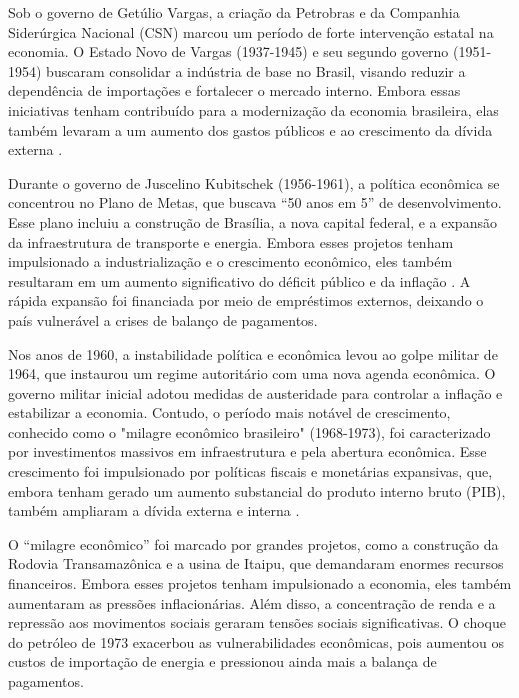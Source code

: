 \documentclass[12pt,oneside,a4paper,chapter=TITLE,english,brazil,sumario=abnt-6027-2012]{abntex2}
\begin{document}
Sob o governo de Getúlio Vargas, a criação da Petrobras e da Companhia Siderúrgica Nacional (CSN) marcou um período de forte intervenção estatal na economia. O Estado Novo de Vargas (1937-1945) e seu segundo governo (1951-1954) buscaram consolidar a indústria de base no Brasil, visando reduzir a dependência de importações e fortalecer o mercado interno. Embora essas iniciativas tenham contribuído para a modernização da economia brasileira, elas também levaram a um aumento dos gastos públicos e ao crescimento da dívida externa \cite{fabiogiambiagi_2016_economia}.

Durante o governo de Juscelino Kubitschek (1956-1961), a política econômica se concentrou no Plano de Metas, que buscava ``50 anos em 5'' de desenvolvimento. Esse plano incluiu a construção de Brasília, a nova capital federal, e a expansão da infraestrutura de transporte e energia. Embora esses projetos tenham impulsionado a industrialização e o crescimento econômico, eles também resultaram em um aumento significativo do déficit público e da inflação \cite{bielschowsky_2022_a}. A rápida expansão foi financiada por meio de empréstimos externos, deixando o país vulnerável a crises de balanço de pagamentos.

Nos anos de 1960, a instabilidade política e econômica levou ao golpe militar de 1964, que instaurou um regime autoritário com uma nova agenda econômica. O governo militar inicial adotou medidas de austeridade para controlar a inflação e estabilizar a economia. Contudo, o período mais notável de crescimento, conhecido como o "milagre econômico brasileiro" (1968-1973), foi caracterizado por investimentos massivos em infraestrutura e pela abertura econômica. Esse crescimento foi impulsionado por políticas fiscais e monetárias expansivas, que, embora tenham gerado um aumento substancial do produto interno bruto (PIB), também ampliaram a dívida externa e interna \cite{amaurypatrickgremaud_2009_economia}.

O ``milagre econômico'' foi marcado por grandes projetos, como a construção da Rodovia Transamazônica e a usina de Itaipu, que demandaram enormes recursos financeiros. Embora esses projetos tenham impulsionado a economia, eles também aumentaram as pressões inflacionárias. Além disso, a concentração de renda e a repressão aos movimentos sociais geraram tensões sociais significativas. O choque do petróleo de 1973 exacerbou as vulnerabilidades econômicas, pois aumentou os custos de importação de energia e pressionou ainda mais a balança de pagamentos.
\end{document}
